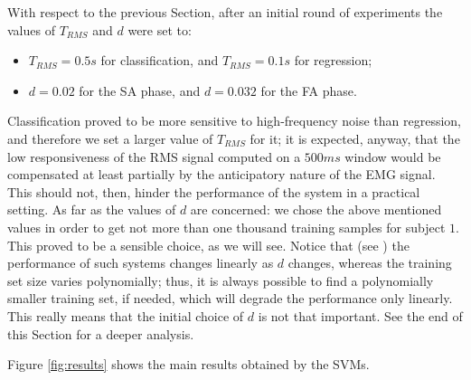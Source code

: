With respect to the previous Section, after an initial round of
experiments the values of $T_{RMS}$ and $d$ were set to:

\begin{itemize}

  \item $T_{RMS}=0.5s$ for classification, and $T_{RMS}=0.1s$ for regression;

  \item $d=0.02$ for the SA phase, and $d=0.032$ for the FA phase.

\end{itemize}

Classification proved to be more sensitive to high-frequency noise
than regression, and therefore we set a larger value of $T_{RMS}$ for
it; it is expected, anyway, that the low responsiveness of the RMS
signal computed on a $500ms$ window would be compensated at least
partially by the anticipatory nature of the EMG signal. This should
not, then, hinder the performance of the system in a practical
setting. As far as the values of $d$ are concerned: we chose the above
mentioned values in order to get not more than one thousand training
samples for subject $1$.  This proved to be a sensible choice, as we
will see. Notice that (see \cite{2008.BioCyb}) the performance of such
systems changes linearly as $d$ changes, whereas the training set size
varies polynomially; thus, it is always possible to find a
polynomially smaller training set, if needed, which will degrade the
performance only linearly. This really means that the initial choice
of $d$ is not that important. See the end of this Section for a deeper
analysis.

Figure \ref{fig:results} shows the main results obtained by the SVMs.

